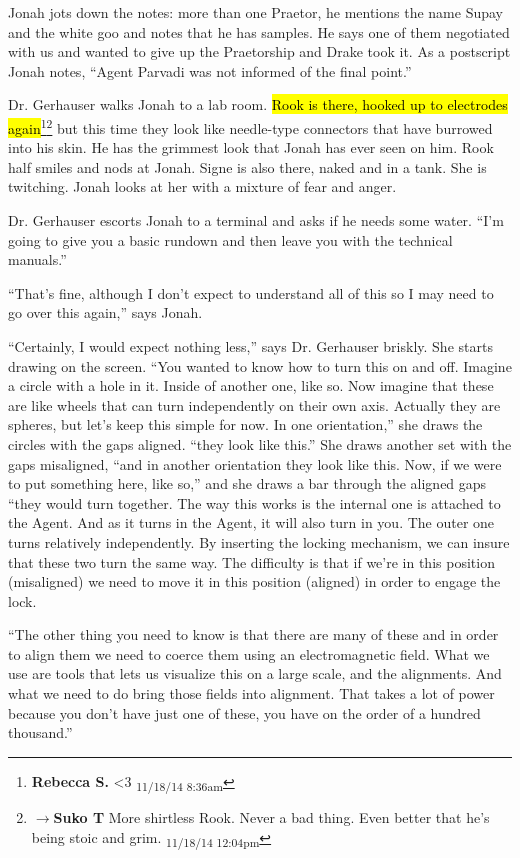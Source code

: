 Jonah jots down the notes: more than one Praetor, he mentions the name Supay and the white goo and notes that he has samples.  He says one of them negotiated with us and wanted to give up the Praetorship and Drake took it.  As a postscript Jonah notes, ``Agent Parvadi was not informed of the final point.''



Dr. Gerhauser walks Jonah to a lab room.  \hl{Rook is there, hooked up to electrodes again}\footnote{\textbf{Rebecca S. }\textless 3 \textsubscript{11/18/14 8:36am}}\footnote{$\rightarrow$\textbf{Suko T }More shirtless Rook.  Never a bad thing.  Even better that he's being stoic and grim. \textsubscript{11/18/14 12:04pm}} but this time they look like needle-type connectors that have burrowed into his skin.  He has the grimmest look that Jonah has ever seen on him.  Rook half smiles and nods at Jonah.  Signe is also there, naked and in a tank.  She is twitching.  Jonah looks at her with a mixture of fear and anger.



Dr. Gerhauser escorts Jonah to a terminal and asks if he needs some water.  ``I'm going to give you a basic rundown and then leave you with the technical manuals.''

``That's fine, although I don't expect to understand all of this so I may need to go over this again,'' says Jonah.

``Certainly, I would expect nothing less,'' says Dr. Gerhauser briskly.  She starts drawing on the screen.  ``You wanted to know how to turn this on and off.  Imagine a circle with a hole in it.  Inside of another one, like so.  Now imagine that these are like wheels that can turn independently on their own axis.  Actually they are spheres, but let's keep this simple for now.  In one orientation,'' she draws the circles with the gaps aligned. ``they look like this.''  She draws another set with the gaps misaligned, ``and in another orientation they look like this. Now, if we were to put something here, like so,'' and she draws a bar through the aligned gaps ``they would turn together.  The way this works is the internal one is attached to the Agent.  And as it turns in the Agent, it will also turn in you.  The outer one turns relatively independently.  By inserting the locking mechanism, we can insure that these two turn the same way. The difficulty is that if we're in this position (misaligned) we need to move it in this position (aligned) in order to engage the lock.

``The other thing you need to know is that there are many of these and in order to align them we need to coerce them using an electromagnetic field.  What we use are tools that lets us visualize this on a large scale, and the alignments.  And what we need to do bring those fields into alignment.  That takes a lot of power because you don't have just one of these, you have on the order of a hundred thousand.''

